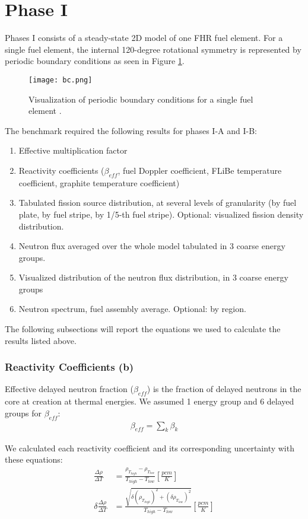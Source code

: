 \section{Phase I}
\label{sec:phase1}
Phases I consists of a steady-state 2D model of one \gls{FHR} fuel element. 
For a single fuel element, the internal 120-degree rotational symmetry is 
represented by periodic boundary conditions as seen in Figure \ref{fig:bc}. 
\begin{figure}[]
    \centering
    \texttt{[image: bc.png]} 
    \caption{Visualization of periodic boundary conditions for a single fuel 
    element \cite{noauthor_fluoride_nodate}.}
    \label{fig:bc}
\end{figure}
The benchmark required the following results for phases I-A and I-B:
\begin{enumerate}[label=(\alph*)]
    \item Effective multiplication factor 
    \item Reactivity coefficients ($\beta_{eff}$, fuel Doppler coefficient, FLiBe 
    temperature coefficient, graphite temperature coefficient)
    \item Tabulated fission source distribution, at several levels of granularity 
    (by fuel plate, by fuel stripe, by 1/5-th fuel stripe). Optional: visualized fission 
    density distribution.
    \item Neutron flux averaged over the whole model tabulated in 3 coarse energy groups. 
    \item Visualized distribution of the neutron flux distribution, in 3 coarse energy groups
    \item Neutron spectrum, fuel assembly average. Optional: by region.
\end{enumerate}

The following subsections will report the equations we used to calculate the
results listed above. 

\subsubsection{Reactivity Coefficients (b)}
Effective delayed neutron fraction ($\beta_{eff}$) is the fraction of delayed 
neutrons in the core at creation at thermal energies. 
We assumed 1 energy group and 6 delayed groups for $\beta_{eff}$: 
\begin{align}
    \beta_{eff} = \sum_k \beta_k
\end{align}

We calculated each reactivity coefficient and its corresponding uncertainty 
with these equations: 
\begin{align}
    \frac{\Delta \rho}{\Delta T} &= 
    \frac{\rho_{T_{high}}-\rho_{T_{low}}}{T_{high}-T_{low}} [\frac{pcm}{K}] \\
    \delta \frac{\Delta \rho}{\Delta T} &= 
    \frac{\sqrt{\delta (\rho_{T_{high}})^2+(\delta \rho_{T_{low}})^2}}{T_{high}-T_{low}} [\frac{pcm}{K}] 
\end{align}

